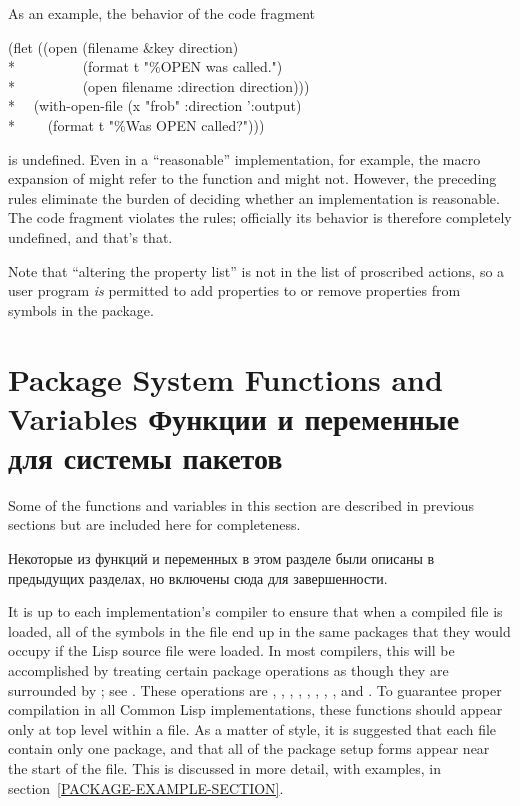 \begin{newer}
As an example, the behavior of the code fragment
\begin{lisp}
(flet ((open (filename \&key direction) \\*
~~~~~~~~~(format t "{\Xtilde}\%OPEN was called.")  \\*
~~~~~~~~~(open filename :direction direction))) \\*
~~(with-open-file (x "frob" :direction ':output)  \\*
~~~~(format t "{\Xtilde}\%Was OPEN called?")))
\end{lisp}
is undefined.  Even in a ``reasonable'' implementation,
for example, the macro expansion of  might refer
to the  function and might not.  However, the preceding rules eliminate
the burden of deciding whether an implementation is reasonable. The code
fragment violates the rules; officially its behavior is therefore
completely undefined, and that's that.

Note that ``altering the property list'' is not in the list of
proscribed actions, so a user program \emph{is} permitted to
add properties to or remove properties from
symbols in the  package.
\end{newer}

\section{Package System Functions and Variables Функции и переменные для системы
пакетов}
\label{PACKAGE-FUNCTIONS-SECTION}

Some of the functions and variables in this section
are described in previous sections but are included here
for completeness.

Некоторые из функций и переменных в этом разделе были описаны в предыдущих
разделах, но включены сюда для завершенности.

\begin{obsolete}
It is up to each implementation's compiler to ensure that when a
compiled file is loaded, all of the symbols in the file end up in the
same packages that they would occupy if the Lisp source file were
loaded.  In most compilers, this will be accomplished by treating
certain package operations as though they are surrounded by
; see .
These operations are
, , , ,
, , , , and .
To guarantee proper compilation in all Common Lisp
implementations, these functions should appear only at top level within
a file.  As a matter of style, it is suggested that each file contain
only one package, and that all of the package setup forms appear near
the start of the file.  This is discussed in more detail, with examples,
in section~\ref{PACKAGE-EXAMPLE-SECTION}.
\end{obsolete}

